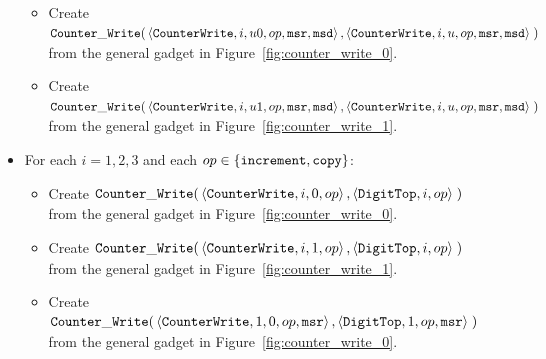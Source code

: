 \begin{itemize}
\begin{itemize}
        \item Create
        $\begin{aligned}[t]
            {\tt Counter\_Write}(& \left\langle {\tt CounterWrite}, i, u0, op, {\tt msr}, {\tt msd} \right\rangle,
                      \left\langle {\tt CounterWrite}, i, u,  op, {\tt msr}, {\tt msd} \right\rangle \;)
        \end{aligned}$ \\ from the general gadget in Figure~\ref{fig:counter_write_0}.

        \item Create
        $\begin{aligned}[t]
            {\tt Counter\_Write}(& \left\langle {\tt CounterWrite}, i,  u1, op, {\tt msr}, {\tt msd} \right\rangle,
                      \left\langle {\tt CounterWrite}, i,  u,  op, {\tt msr}, {\tt msd} \right\rangle \;)
        \end{aligned}$ \\ from the general gadget in Figure~\ref{fig:counter_write_1}.
        \end{itemize}

    \item For each $i = 1,2,3$ and each $op \in \{{\tt increment}, {\tt copy} \}$:
    \begin{itemize}
        \item Create
        $\begin{aligned}[t]
            {\tt Counter\_Write}(& \left\langle {\tt CounterWrite}, i, 0, op \right\rangle,
                      \left\langle {\tt DigitTop},     i,    op \right\rangle \;)
        \end{aligned}$ \\ from the general gadget in Figure~\ref{fig:counter_write_0}.

        \item Create
        $\begin{aligned}[t]
            {\tt Counter\_Write}(& \left\langle {\tt CounterWrite}, i, 1, op \right\rangle,
                      \left\langle {\tt DigitTop},     i,    op \right\rangle \;)
        \end{aligned}$ \\ from the general gadget in Figure~\ref{fig:counter_write_1}.

        \item Create
        $\begin{aligned}[t]
            {\tt Counter\_Write}(& \left\langle {\tt CounterWrite}, 1, 0, op, {\tt msr} \right\rangle,
                      \left\langle {\tt DigitTop},     1,    op, {\tt msr} \right\rangle \;)
        \end{aligned}$ \\ from the general gadget in Figure~\ref{fig:counter_write_0}.


\end{itemize}
\end{itemize}
